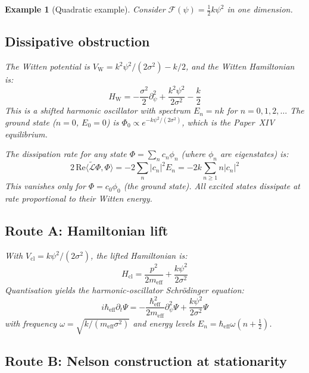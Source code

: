 \documentclass[12pt]{article}
\newtheorem{example}[theorem]{Example}
\newcommand{\Fcal}{\mathcal{F}}
\newcommand{\Lcal}{\mathcal{L}}
\begin{document}
\begin{example}[Quadratic example]\label{ex:quadratic}
Consider $\Fcal(\psi) = \frac{1}{2}k\psi^2$ in one dimension.

\subsection*{Dissipative obstruction}

The Witten potential is $V_{\mathrm{W}} = k^2\psi^2/(2\sigma^2) - k/2$, and the Witten Hamiltonian is:
\begin{equation}
    H_{\mathrm{W}} = -\frac{\sigma^2}{2}\partial_\psi^2 + \frac{k^2\psi^2}{2\sigma^2} - \frac{k}{2}
\end{equation}
This is a shifted harmonic oscillator with spectrum $E_n = nk$ for $n = 0, 1, 2, \ldots$ The ground state ($n=0$, $E_0 = 0$) is $\Phi_0 \propto e^{-k\psi^2/(2\sigma^2)}$, which is the Paper~XIV equilibrium.

The dissipation rate for any state $\Phi = \sum_n c_n \phi_n$ (where $\phi_n$ are eigenstates) is:
\begin{equation}
    2\,\mathrm{Re}\langle\tilde{\Lcal}\Phi,\Phi\rangle = -2\sum_n |c_n|^2 E_n = -2k\sum_{n \geq 1} n|c_n|^2
\end{equation}
This vanishes only for $\Phi = c_0\phi_0$ (the ground state). All excited states dissipate at rate proportional to their Witten energy.

\subsection*{Route A: Hamiltonian lift}

With $V_{\mathrm{cl}} = k\psi^2/(2\sigma^2)$, the lifted Hamiltonian is:
\begin{equation}
    H_{\mathrm{cl}} = \frac{p^2}{2m_{\mathrm{eff}}} + \frac{k\psi^2}{2\sigma^2}
\end{equation}
Quantisation yields the harmonic-oscillator Schr\"odinger equation:
\begin{equation}
    i\hbar_{\mathrm{eff}}\partial_t\Psi = -\frac{\hbar_{\mathrm{eff}}^2}{2m_{\mathrm{eff}}}\partial_\psi^2\Psi + \frac{k\psi^2}{2\sigma^2}\Psi
\end{equation}
with frequency $\omega = \sqrt{k/(m_{\mathrm{eff}}\sigma^2)}$ and energy levels $E_n = \hbar_{\mathrm{eff}}\omega(n + \frac{1}{2})$.

\subsection*{Route B: Nelson construction at stationarity}


\end{example}
\end{document}
